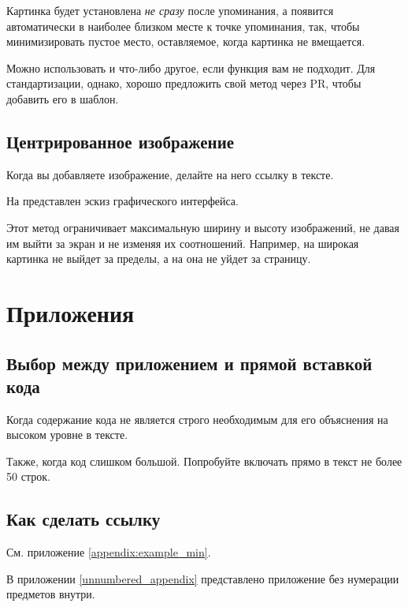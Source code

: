 \documentclass[a4paper,12pt]{report}
\begin{document}
Картинка будет установлена \textit{не сразу} после упоминания,
а появится автоматически в наиболее близком месте к точке упоминания,
так, чтобы минимизировать пустое место, 
оставляемое, когда картинка не вмещается.

Можно использовать и что-либо другое, если функция вам не подходит.
Для стандартизации, однако, хорошо предложить свой метод через \gls{PR}, чтобы добавить его в шаблон.

\subsection{Центрированное изображение}

Когда вы добавляете изображение, делайте на него ссылку в тексте.

На  представлен эскиз графического интерфейса.


Этот метод ограничивает максимальную ширину и высоту изображений, 
не давая им выйти за экран и не изменяя их соотношений.
Например, на  широкая картинка не выйдет за пределы,
а на  она не уйдет за страницу.



\section{Приложения}

\subsection{Выбор между приложением и прямой вставкой кода}

Когда содержание кода не является строго необходимым
для его объяснения на высоком уровне в тексте.

Также, когда код слишком большой.
Попробуйте включать прямо в текст не более 50 строк.

\subsection{Как сделать ссылку}

См. приложение \ref{appendix:example_min}.

В приложении \ref{unnumbered_appendix} представлено приложение без нумерации предметов внутри.
\end{document}
